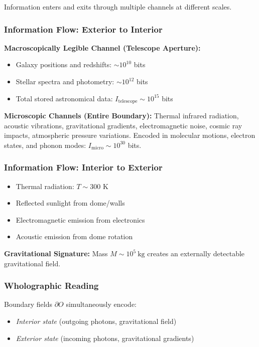 ﻿\documentclass[12pt]{article}
\begin{document}
Information enters and exits through multiple channels at different scales.


\subsubsection{Information Flow: Exterior to Interior}


\textbf{Macroscopically Legible Channel (Telescope Aperture):}


\begin{itemize}
  \item Galaxy positions and redshifts: $\sim 10^{10}$ bits
  \item Stellar spectra and photometry: $\sim 10^{12}$ bits
  \item Total stored astronomical data: $I_\mathrm{telescope} \sim 10^{15}$ bits
\end{itemize}


\textbf{Microscopic Channels (Entire Boundary):} Thermal infrared radiation, acoustic vibrations, gravitational gradients, electromagnetic noise, cosmic ray impacts, atmospheric pressure variations. Encoded in molecular motions, electron states, and phonon modes: $I_\mathrm{micro} \sim 10^{30}$ bits.


\subsubsection{Information Flow: Interior to Exterior}


\begin{itemize}
  \item Thermal radiation: $T \sim 300$ K
  \item Reflected sunlight from dome/walls
  \item Electromagnetic emission from electronics
  \item Acoustic emission from dome rotation
\end{itemize}


\textbf{Gravitational Signature:} Mass $M \sim 10^5~\mathrm{kg}$ creates an externally detectable gravitational field.


\subsubsection{Wholographic Reading}


Boundary fields $\partial O$ simultaneously encode:


\begin{itemize}
  \item \emph{Interior state} (outgoing photons, gravitational field)
  \item \emph{Exterior state} (incoming photons, gravitational gradients)
\end{itemize}
\end{document}
